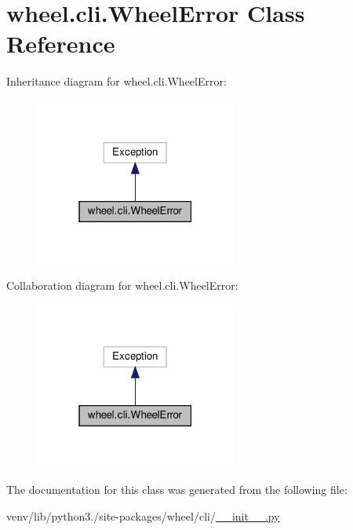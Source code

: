\hypertarget{classwheel_1_1cli_1_1WheelError}{}\section{wheel.\+cli.\+Wheel\+Error Class Reference}
\label{classwheel_1_1cli_1_1WheelError}


Inheritance diagram for wheel.\+cli.\+Wheel\+Error\+:
\nopagebreak
\begin{figure}[H]
\begin{center}
\leavevmode
\includegraphics[width=187pt]{classwheel_1_1cli_1_1WheelError__inherit__graph}
\end{center}
\end{figure}


Collaboration diagram for wheel.\+cli.\+Wheel\+Error\+:
\nopagebreak
\begin{figure}[H]
\begin{center}
\leavevmode
\includegraphics[width=187pt]{classwheel_1_1cli_1_1WheelError__coll__graph}
\end{center}
\end{figure}


The documentation for this class was generated from the following file\+:\begin{DoxyCompactItemize}
\item 
venv/lib/python3./site-\/packages/wheel/cli/\hyperlink{venv_2lib_2python3_89_2site-packages_2wheel_2cli_2____init_____8py}{\+\_\+\+\_\+init\+\_\+\+\_\+.\+py}\end{DoxyCompactItemize}
